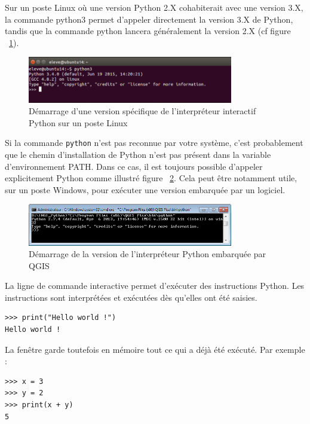 \documentclass[12pt, a4paper]{article}
\begin{document}
Sur un poste Linux où une version Python 2.X cohabiterait avec une version 3.X, la commande python3 permet d'appeler directement la version 3.X de Python, tandis que la commande python lancera généralement la version 2.X (cf figure ~\ref{demarrer_session-3}).

\begin{figure}[H]
	\center \includegraphics[width=0.8\textwidth]{img/demarrer_session_interactive-3.png}
	\caption{Démarrage d'une version spécifique de l'interpréteur interactif Python sur un poste Linux}
	\label{demarrer_session-3}
\end{figure}

Si la commande \lstinline{python} n'est pas reconnue par votre système, c'est probablement que le chemin d'installation de Python n'est pas présent dans la variable d'environnement PATH. Dans ce cas, il est toujours possible d'appeler explicitement Python comme illustré figure ~\ref{demarrer_session-4}. Cela peut être notamment utile, sur un poste Windows, pour exécuter une version embarquée par un logiciel.
\begin{figure}
	\center \includegraphics[width=0.8\textwidth]{img/demarrer_session_interactive-4.png}
	\caption{Démarrage de la version de l'interpréteur Python embarquée par QGIS}
	\label{demarrer_session-4}
\end{figure}

La ligne de commande interactive permet d'exécuter des instructions Python. Les instructions sont interprétées et exécutées dès qu'elles ont été saisies. 
\begin{lstlisting}
>>> print("Hello world !")
Hello world !
\end{lstlisting}

La fenêtre garde toutefois en mémoire tout ce qui a déjà été exécuté. Par exemple :
\begin{lstlisting}
>>> x = 3
>>> y = 2
>>> print(x + y)
5
\end{lstlisting}
\end{document}
